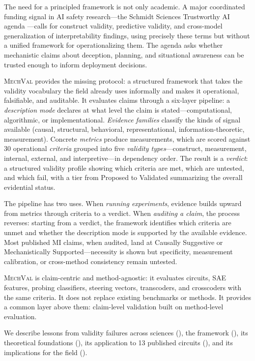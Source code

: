 \documentclass[10pt]{article}
\newcommand{\mechval}{\textsc{MechVal}}
\begin{document}
The need for a principled framework is not only academic.  A major coordinated funding signal in AI safety research---the Schmidt Sciences Trustworthy AI agenda \citep{schmidt2026trustworthy}---calls for construct validity, predictive validity, and cross-model generalization of interpretability findings, using precisely these terms but without a unified framework for operationalizing them.  The agenda asks whether mechanistic claims about deception, planning, and situational awareness can be trusted enough to inform deployment decisions.

\mechval{} provides the missing protocol: a structured framework that takes the validity vocabulary the field already uses informally and makes it operational, falsifiable, and auditable. It evaluates claims through a six-layer pipeline: a \emph{description mode} declares at what level the claim is stated---computational, algorithmic, or implementational. \emph{Evidence families} classify the kinds of signal available (causal, structural, behavioral, representational, information-theoretic, measurement). Concrete \emph{metrics} produce measurements, which are scored against 30 operational \emph{criteria} grouped into five \emph{validity types}---construct, measurement, internal, external, and interpretive---in dependency order. The result is a \emph{verdict}: a structured validity profile showing which criteria are met, which are untested, and which fail, with a tier from Proposed to Validated summarizing the overall evidential status.

The pipeline has two uses. When \emph{running experiments}, evidence builds upward from metrics through criteria to a verdict. When \emph{auditing a claim}, the process reverses: starting from a verdict, the framework identifies which criteria are unmet and whether the description mode is supported by the available evidence. Most published MI claims, when audited, land at Causally Suggestive or Mechanistically Supported---necessity is shown but specificity, measurement calibration, or cross-method consistency remain untested.

\mechval{} is claim-centric and method-agnostic: it evaluates circuits, SAE features, probing classifiers, steering vectors, transcoders, and crosscoders with the same criteria. It does not replace existing benchmarks or methods. It provides a common layer above them: claim-level validation built on method-level evaluation.

We describe lessons from validity failures across sciences (), the framework (), its theoretical foundations (), its application to 13 published circuits (), and its implications for the field ().
\end{document}
